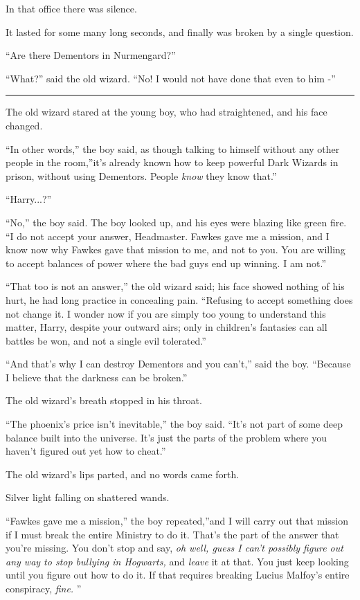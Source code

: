 In that office there was silence.

It lasted for some many long seconds, and finally was broken by a single
question.

``Are there Dementors in Nurmengard?''

``What?'' said the old wizard. ``No! I would not have done that even to
him -''

\begin{center}\rule{3in}{0.4pt}\end{center}

The old wizard stared at the young boy, who had straightened, and his
face changed.

``In other words,'' the boy said, as though talking to himself without
any other people in the room,''it's already known how to keep powerful
Dark Wizards in prison, without using Dementors. People \emph{know} they
know that.''

``Harry...?''

``No,'' the boy said. The boy looked up, and his eyes were blazing like
green fire. ``I do not accept your answer, Headmaster. Fawkes gave me a
mission, and I know now why Fawkes gave that mission to me, and not to
you. You are willing to accept balances of power where the bad guys end
up winning. I am not.''

``That too is not an answer,'' the old wizard said; his face showed
nothing of his hurt, he had long practice in concealing pain. ``Refusing
to accept something does not change it. I wonder now if you are simply
too young to understand this matter, Harry, despite your outward airs;
only in children's fantasies can all battles be won, and not a single
evil tolerated.''

``And that's why I can destroy Dementors and you can't,'' said the boy.
``Because I believe that the darkness can be broken.''

The old wizard's breath stopped in his throat.

``The phoenix's price isn't inevitable,'' the boy said. ``It's not part
of some deep balance built into the universe. It's just the parts of the
problem where you haven't figured out yet how to cheat.''

The old wizard's lips parted, and no words came forth.

Silver light falling on shattered wands.

``Fawkes gave me a mission,'' the boy repeated,''and I will carry out
that mission if I must break the entire Ministry to do it. That's the
part of the answer that you're missing. You don't stop and say, \emph{oh
well, guess I can't possibly figure out any way to stop bullying in
Hogwarts,} and \emph{leave} it at that. You just keep looking until you
figure out how to do it. If that requires breaking Lucius Malfoy's
entire conspiracy, \emph{fine.} ''

